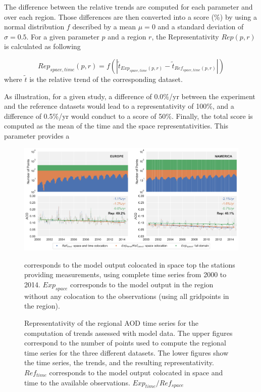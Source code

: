 \documentclass[journal abbreviation, manuscript]{copernicus}
\begin{document}
The difference between the relative trends are computed for each parameter and over each region. Those differences are then converted into a score (\unit{\%}) by using a normal distribution $f$ described by a mean $\mu=0$ and a standard deviation of $\sigma=0.5$. For a given parameter $p$ and a region $r$, the Representativity $Rep(p,r)$ is calculated as following

\begin{equation}
 Rep_{space,time}(p, r) = {f\left(\left| \tilde{t}_{Exp_{space,time}(p, r)}-\tilde{t}_{Ref_{space,time}(p, r)} \right|\right)}
\end{equation}
where $\tilde{t}$ is the relative trend of the corresponding dataset.

As illustration, for a given study, a difference of 0.0\%/yr between the experiment and the reference datasets would lead to a representativity of 100\%, and a difference of 0.5\%/yr would conduct to a score of 50\%. Finally, the total score is computed as the mean of the time and the space representativities. This parameter provides a 

\begin{figure}[t]
 \includegraphics[width=16cm]{../scripts/figs/representativity-od550aer.png}
 \caption{Representativity of the regional AOD time series for the computation of trends assessed with model data. The upper figures correspond to the number of points used to compute the regional time series for the three different datasets. The lower figures show the time series, the trends, and the resulting representativity. $Ref_{time}$ corresponds to the model output colocated in space and time to the available observations. $Exp_{time}/Ref_{space}$} corresponds to the model output colocated in space top the stations providing measurements, using complete time series from 2000 to 2014. $Exp_{space}$ corresponds to the model output in the region without any colocation to the observations (using all gridpoints in the region).
 \label{fig:representativity}
\end{figure}
\end{document}
